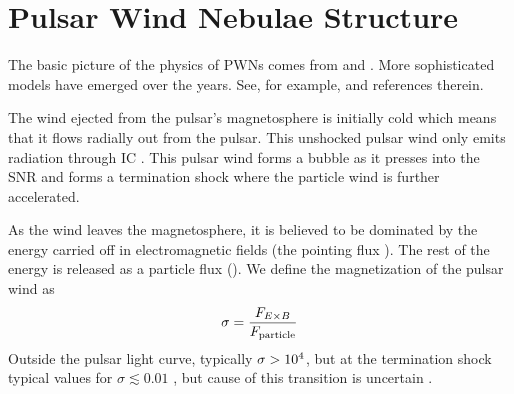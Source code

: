 \section{Pulsar Wind Nebulae Structure}


The basic picture of the physics of \acp{PWN}
comes from \cite{rees_1974_origin-magnetic} and
\cite{kennel_1984_magnetohydrodynamic-model}.  More 
sophisticated models have emerged over the years.  See, for example,
\cite{gelfand_2009_dynamical-model} and references therein.

The wind ejected from the pulsar's magnetosphere is initially
cold which means that it flows radially out from the pulsar.
This unshocked pulsar wind only emits radiation through \ac{IC}
\citep{bogovalov_2000_very-high-energy-gamma}.  This pulsar wind forms
a bubble as it presses into the \ac{SNR} and forms a termination shock
where the particle wind is further accelerated.


As the wind leaves the magnetosphere, it is believed to be dominated
by the energy carried off in electromagnetic fields (the pointing flux
\pointingflux).  The rest of the energy is released as a particle flux
(\particleflux).  We define the magnetization of the pulsar wind as
\begin{equation}
  \sigma = \frac{F_{E\times B}}{F_\text{particle}}
\end{equation}
Outside the pulsar light curve, typically $\sigma>10^4$,
but at the termination shock typical values for $\sigma\lesssim0.01$
\cite{kennel_1984a_confinement-pulsars},
but cause of this transition is uncertain \citep{gaensler_2006_evolution-structure}.

